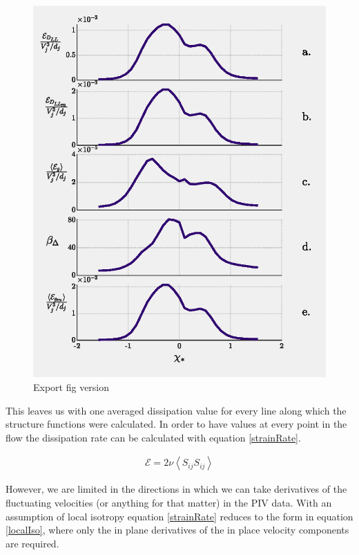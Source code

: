 \documentclass{article}
\newcommand\dsize[1]{\ensuremath{\mathcal{\scriptstyle {#1} } }} %
\newcommand\ensem[1]{\ensuremath{\left< {#1} \right>}} %
\newcommand{\diss}{\dsize{E}}
\newenvironment{myeq}   %
    {\begin{equation}
    \begin{gathered}
    }
    {
    \end{gathered}
    \end{equation}
    }
\begin{document}
\begin{figure}[b]
    \centering
    \includegraphics[scale = 0.75]{figs/PG_4Hz_Diss_Splots.eps}
    \caption{Export fig version}
    \label{DissPlot}
\end{figure}

This leaves us with one averaged dissipation value for every line along which the structure functions were calculated. In order to have values at every point in the flow the dissipation rate can be calculated with equation \ref{strainRate}. 

\begin{myeq}
    \diss = 2 \nu \ensem{S_{ij}S_{ij}}
    \label{strainRate}
\end{myeq}

However, we are limited in the directions in which we can take derivatives of the fluctuating velocities (or anything for that matter) in the PIV data. With an assumption of local isotropy equation \ref{strainRate} reduces to the form in equation \ref{localIso}, where only the in plane derivatives of the in place velocity components are required. 
\end{document}
